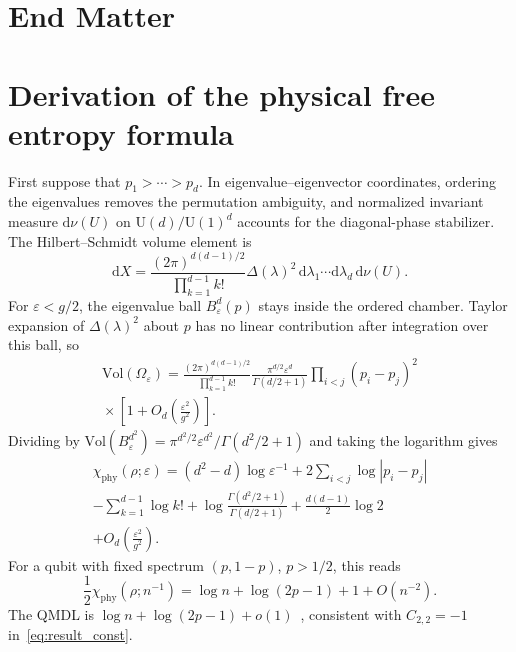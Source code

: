 \documentclass[aps,prl,twocolumn,superscriptaddress,amsmath,amssymb,reprint,longbibliography]{revtex4-2}
\newcommand{\dd}{\mathrm{d}}
\def\eps{\varepsilon}
\begin{document}
\section*{End Matter}
\appendix
\setcounter{secnumdepth}{1}

\section{Derivation of the physical free entropy formula}

First suppose that $p_1>\cdots>p_d$. In eigenvalue--eigenvector coordinates, ordering the eigenvalues removes the permutation ambiguity, and normalized invariant measure $\dd\nu(U)$ on $\mathrm U(d)/\mathrm U(1)^d$ accounts for the diagonal-phase stabilizer. The Hilbert--Schmidt volume element is~\cite{zyczkowski2003hilbert}
\begin{equation}\label{eq:hs_volume_element}
    \dd X=\frac{(2\pi)^{d(d-1)/2}}{\prod_{k=1}^{d-1}k!}
    \Delta(\lambda)^2\,\dd\lambda_1\cdots\dd\lambda_d\,\dd\nu(U).
\end{equation}
For $\eps<g/2$, the eigenvalue ball $B_\eps^d(p)$ stays inside the ordered chamber. Taylor expansion of $\Delta(\lambda)^2$ about $p$ has no linear contribution after integration over this ball, so
\begin{multline}
    \mathrm{Vol}(\Omega_\eps)
    =\frac{(2\pi)^{d(d-1)/2}}{\prod_{k=1}^{d-1}k!}
    \frac{\pi^{d/2}\eps^d}{\Gamma(d/2+1)}
    \prod_{i<j}(p_i-p_j)^2\\
    {}\times\left[1+O_d\!\left(\frac{\eps^2}{g^2}\right)\right].
\end{multline}
Dividing by $\mathrm{Vol}(B_\eps^{d^2})=\pi^{d^2/2}\eps^{d^2}/\Gamma(d^2/2+1)$ and taking the logarithm gives
\begin{multline}\label{eq:free_phys1_app}
    \chi_{\mathrm{phy}}(\rho;\eps)
    =(d^2-d)\log\eps^{-1}
    +2\sum_{i<j}\log|p_i-p_j|\\
    -\sum_{k=1}^{d-1}\log k!
    +\log\frac{\Gamma(d^2/2+1)}{\Gamma(d/2+1)}
    +\frac{d(d-1)}2\log2\\
    +O_d\!\left(\frac{\eps^2}{g^2}\right).
\end{multline}
For a qubit with fixed spectrum $(p,1-p)$, $p>1/2$, this reads
\[
\frac12\chi_\mathrm{phy}(\rho;n^{-1})
=\log n+\log(2p-1)+1+O(n^{-2}).
\]
The QMDL is $\log n+\log(2p-1)+o(1)$~\cite{paper2}, consistent with $C_{2,2}=-1$ in~\eqref{eq:result_const}.
\end{document}

